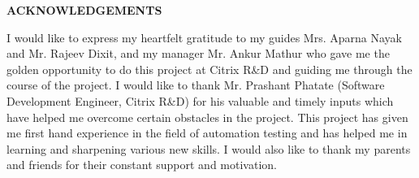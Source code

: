 
\begin{center}
\large{\textbf{ACKNOWLEDGEMENTS}}\\
\vspace{1cm}
\end{center}
I would like to express my heartfelt gratitude to my guides Mrs. Aparna Nayak and Mr. Rajeev Dixit, and my manager Mr. Ankur Mathur who gave me the golden opportunity to do this project at Citrix R\&D and guiding me through the course of the project.  I would like to thank Mr. Prashant Phatate (Software Development Engineer, Citrix R\&D) for his valuable and timely inputs which have helped me overcome certain obstacles in the project. This project has given me first hand experience in the field of automation testing and has helped me in learning and sharpening various new skills. I would also like to thank my parents and friends for their constant support and motivation.
